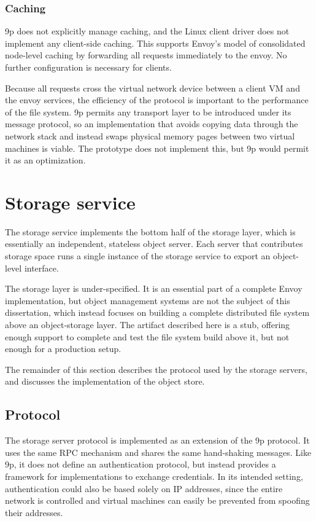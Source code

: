\subsubsection{Caching}

9p does not explicitly manage caching, and the Linux client driver does not implement any client-side caching. This supports Envoy's model of consolidated node-level caching by forwarding all requests immediately to the envoy. No further configuration is necessary for clients.

Because all requests cross the virtual network device between a client VM and the envoy services, the efficiency of the protocol is important to the performance of the file system. 9p permits any transport layer to be introduced under its message protocol, so an implementation that avoids copying data through the network stack and instead swaps physical memory pages between two virtual machines is viable. The prototype does not implement this, but 9p would permit it as an optimization.

\section{Storage service}

The storage service implements the bottom half of the storage layer, which is essentially an independent, stateless object server. Each server that contributes storage space runs a single instance of the storage service to export an object-level interface.

The storage layer is under-specified. It is an essential part of a complete Envoy implementation, but object management systems are not the subject of this dissertation, which instead focuses on building a complete distributed file system above an object-storage layer. The artifact described here is a stub, offering enough support to complete and test the file system build above it, but not enough for a production setup.

The remainder of this section describes the protocol used by the storage servers, and discusses the implementation of the object store.

\subsection{Protocol}

The storage server protocol is implemented as an extension of the 9p protocol. It uses the same RPC mechanism and shares the same hand-shaking messages. Like 9p, it does not define an authentication protocol, but instead provides a framework for implementations to exchange credentials. In its intended setting, authentication could also be based solely on IP addresses, since the entire network is controlled and virtual machines can easily be prevented from spoofing their addresses.

